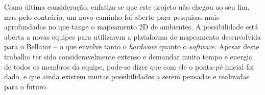 Como última consideração, enfatiza-se que este projeto não chegou ao seu fim, mas pelo contrário, um novo caminho foi aberto para pesquisas mais aprofundadas no que tange o mapeamento 2D de ambientes. A possibilidade está aberta a novas equipes para utilizarem a plataforma de mapeamento desenvolvida para o Bellator -- o que envolve tanto o \textit{hardware} quanto o \textit{software}. Apesar deste trabalho ter sido consideravelmente extenso e demandar muito tempo e energia de todos os membros da equipe, pode-se dizer que com ele o ponta-pé inicial foi dado, e que ainda existem muitas possibilidades a serem pensadas e realizadas para o futuro.


%


